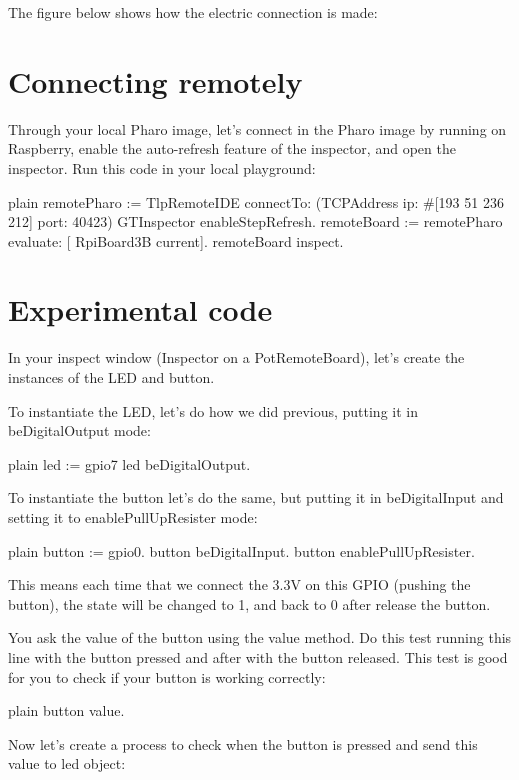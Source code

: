 \documentclass[10pt,twoside,english]{_support/latex/sbabook/sbabook}
\begin{document}
The figure below shows how the electric connection is made:
\section{Connecting remotely}
Through your local Pharo image, let’s connect in the Pharo image by running on Raspberry, enable the auto-refresh feature of the inspector, and open the inspector.
Run this code in your local playground:

\begin{displaycode}{plain}
remotePharo := TlpRemoteIDE connectTo: (TCPAddress ip: #[193 51 236 212] port: 40423)
GTInspector enableStepRefresh.
remoteBoard := remotePharo evaluate: [ RpiBoard3B current].
remoteBoard inspect.
\end{displaycode}
\section{Experimental code}
In your inspect window (Inspector on a PotRemoteBoard), let’s create the instances of the LED and button.

To instantiate the LED, let’s do how we did previous, putting it in beDigitalOutput mode:

\begin{displaycode}{plain}
led := gpio7
led beDigitalOutput.
\end{displaycode}

To instantiate the button let’s do the same, but putting it in beDigitalInput and setting it to enablePullUpResister mode:

\begin{displaycode}{plain}
button := gpio0.
button beDigitalInput.
button enablePullUpResister.
\end{displaycode}

This means each time that we connect the 3.3V on this GPIO (pushing the button), the state will be changed to 1, and back to 0 after release the button.

You ask the value of the button using the value method. Do this test running this line with the button pressed and after with the button released. This test is good for you to check if your button is working correctly:

\begin{displaycode}{plain}
button value.
\end{displaycode}

Now let’s create a process to check when the button is pressed and send this value to led object:
\end{document}
